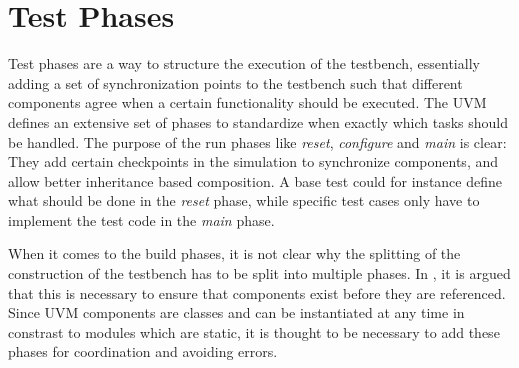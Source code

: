 \section{Test Phases} %

Test phases are a way to structure the execution of the testbench, essentially adding a set of synchronization points
to the testbench such that different components agree when a certain functionality should be executed. The UVM
defines an extensive set of phases to standardize when exactly which tasks should be handled. The purpose of the run
phases like \textit{reset}, \textit{configure} and \textit{main} is clear: They add certain checkpoints in the
simulation to synchronize components, and allow better inheritance based composition. A base test could for instance
define what should be done in the \textit{reset} phase, while specific test cases only have to implement the test
code in the \textit{main} phase.

When it comes to the build phases, it is not clear why the splitting of the construction of the testbench has to be
split into multiple phases. In \cite{uvm_phases}, it is argued that this is necessary to ensure that components exist
before they are referenced. Since UVM components are classes and can be instantiated at any time in constrast to
modules which are static, it is thought to be necessary to add these phases for coordination and avoiding errors.

